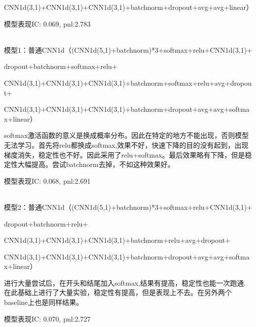 \documentclass[11pt]{ctexart}
\begin{document}
CNN1d(3,1)+CNN1d(3,1)+CNN1d(3,1)+batchnorm+dropout+avg+avg+linear）

模型表现{\kaishu \small IC: 0.069, pnl:2.783}

~\\
模型1：普通CNN1d（(CNN1d(5,1)+batchnorm)*3+softmax+relu+CNN1d(3,1)+

dropout+batchnorm+softmax+relu+

CNN1d(3,1)+CNN1d(3,1)+CNN1d(3,1)+batchnorm+softmax+relu+avg+dropout+

CNN1d(3,1)+CNN1d(3,1)+CNN1d(3,1)+batchnorm+dropout+avg+avg+softmax+linear）

softmax激活函数的意义是换成概率分布。因此在特定的地方不能出现，否则模型无法学习。首先将relu都换成softmax,效果不好，快速下降的目的没有起到，出现梯度消失，稳定性也不好。因此采用了relu+softmax。最后效果略有下降，但是稳定性大幅提高。尝试batchnorm去掉，不如这种效果好。

模型表现{\kaishu \small IC: 0.068, pnl:2.691}

~\\
模型2：普通CNN1d（(CNN1d(5,1)+batchnorm)*3+softmax+relu+CNN1d(3,1)+

dropout+batchnorm+relu+

CNN1d(3,1)+CNN1d(3,1)+CNN1d(3,1)+batchnorm+relu+avg+dropout+

CNN1d(3,1)+CNN1d(3,1)+CNN1d(3,1)+batchnorm+dropout+avg+avg+softmax+linear）

进行大量尝试后，在开头和结尾加入softmax,结果有提高，稳定性也能一次跑通.在此基础上进行了大量实验，稳定性有提高，但是表现上不去。在另外两个baseline上也是同样结果。

模型表现{\kaishu \small IC: 0.070, pnl:2.727}
\end{document}
